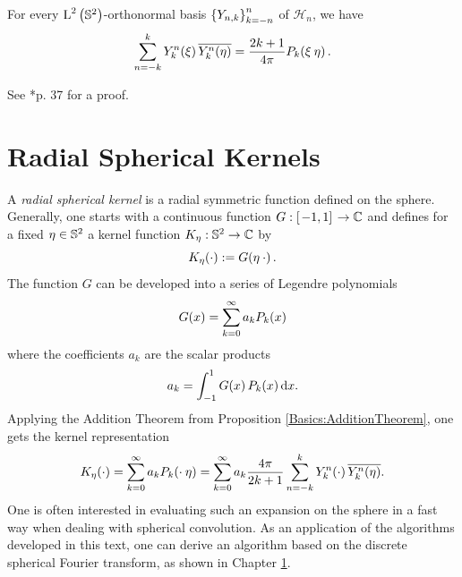 \begin{proposition}
  \label{Basics:AdditionTheorem}
  For every $\text{\rm{L}}^{2}\left(\mathbb{S}^2\right)$-orthonormal basis 
  $\left\{Y_{n,k}\right\rbrace_{k=-n}^{n}$ of $\mathcal{H}_n$, we have
  \begin{equation}
    \nonumber
    \sum_{n=-k}^{k} Y_{k}^n{\hspace{-0.4ex}}\left(\mathbf{\xi}\right) \overline{Y_{k}^n{\hspace{-0.4ex}}\left(\mathbf{\eta}\right)} =
    \frac{2k+1}{4\pi}P_k{\hspace{-0.4ex}}\left(\mathbf{\xi} \: \mathbf{\eta}\right).
  \end{equation}
\end{proposition}

See \cite{freeden}*{p. 37} for a proof.

\section{Radial Spherical Kernels}
A \emph{radial spherical kernel} is a radial symmetric function defined on the sphere. 
Generally, one starts with a continuous function $G: \left[\left.-1,1\right]\right. \rightarrow \mathbb{C}$ and defines 
for a fixed $\mathbf{\eta} \in \mathbb{S}^2$ a kernel function $K_{\mathbf{\eta}}: \mathbb{S}^2 \rightarrow \mathbb{C}$ by
$$ K_{\mathbf{\eta}}{\hspace{-0.4ex}}\left(\cdot\right) := G{\hspace{-0.4ex}}\left(\mathbf{\eta} \: \mathbf{\cdot}\right).$$
The function $G$ can be developed into a series of Legendre polynomials
$$ G{\hspace{-0.4ex}}\left(x\right) = \sum_{k = 0}^{\infty} a_k P_k{\hspace{-0.4ex}}\left(x\right)$$
where the coefficients $a_k$ are the scalar products
$$ a_k = \int_{-1}^{1} G{\hspace{-0.4ex}}\left(x\right) P_k{\hspace{-0.4ex}}\left(x\right) \text{\rm{d}} x.$$
Applying the Addition Theorem from Proposition \ref{Basics:AdditionTheorem}, one gets the kernel 
representation
$$K_{\mathbf{\eta}}{\hspace{-0.4ex}}\left(\cdot\right) = \sum_{k = 0}^{\infty} a_k P_k{\hspace{-0.4ex}}\left(\mathbf{\cdot} \: \mathbf{\eta}\right) =  
\sum_{k = 0}^{\infty} a_k \frac{4\pi}{2k+1} \sum_{n=-k}^k Y_{k}^n{\hspace{-0.4ex}}\left(\mathbf{\cdot}\right) \overline{Y_{k}^n{\hspace{-0.4ex}}\left(\mathbf{\eta}\right)}.$$
One is often interested in evaluating such an expansion on the sphere in a fast way when dealing with 
spherical convolution. As an application of the algorithms developed in this text, one can derive 
an algorithm based on the discrete spherical Fourier transform, as shown in Chapter \ref{}.

